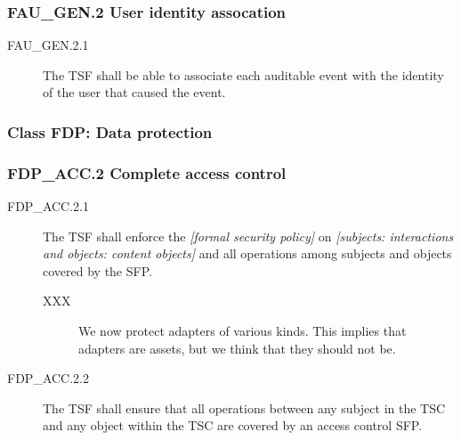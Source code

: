 \documentclass[10pt,a4paper,english]{article}
\begin{document}

\hypertarget{fau-gen-2-user-identity-assocation}{}
\subsubsection*{FAU{\_}GEN.2 User identity assocation}
\begin{description}
\item[FAU{\_}GEN.2.1]

The TSF shall be able to associate each auditable event with the identity
of the user that caused the event.

\end{description}



\hypertarget{class-fdp-data-protection}{}
\subsubsection*{Class FDP: Data protection}



\hypertarget{fdp-acc-2-complete-access-control}{}
\subsubsection*{FDP{\_}ACC.2 Complete access control}
\begin{description}
\item[FDP{\_}ACC.2.1 ]

The TSF shall enforce the \emph{{[}formal security policy]} on
\emph{{[}subjects: interactions and objects: content objects]} and all
operations among subjects and objects covered by the SFP.
\begin{description}
\item[XXX]

We now protect adapters of various kinds. This implies that
adapters are assets, but we think that they should not be.

\end{description}

\item[FDP{\_}ACC.2.2]

The TSF shall ensure that all operations between any
subject in the TSC and any object within the TSC are covered by an
access control SFP.

\end{description}
\end{document}
